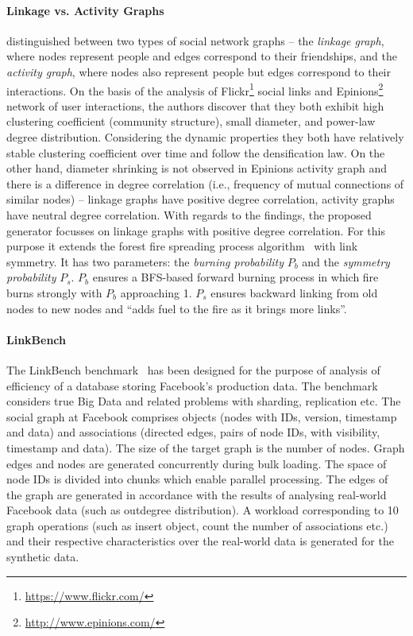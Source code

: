 \paragraph{Linkage vs. Activity Graphs}
\cite{Yao2011} distinguished between two types of social network graphs -- the
\emph{linkage graph}, where nodes represent people and edges correspond to their
friendships, and the \emph{activity graph}, where nodes also represent people
but edges correspond to their interactions. On the basis of the analysis of
Flickr\footnote{\url{https://www.flickr.com/}} social links and
Epinions\footnote{\url{http://www.epinions.com/}} network of user interactions,
the authors discover that they both exhibit high clustering coefficient
(community structure), small diameter, and power-law degree distribution.
Considering the dynamic properties they both have relatively stable clustering
coefficient over time and follow the densification law. On the other hand,
diameter shrinking is not observed in Epinions activity graph and there is a
difference in degree correlation (i.e., frequency of mutual connections of
similar nodes) -- linkage graphs have positive degree correlation, activity
graphs have neutral degree correlation. With regards to the findings, the
proposed generator focusses on linkage graphs with positive degree correlation.
For this purpose it extends the forest fire spreading process
algorithm~\cite{Leskovec:2005:GOT:1081870.1081893} with link symmetry. It has
two parameters: the \emph{burning probability} $P_b$ and the \emph{symmetry
probability} $P_s$. $P_b$ ensures a BFS-based forward burning process in which
fire burns strongly with $P_b$ approaching 1.  $P_s$ ensures backward linking
from old nodes to new nodes and ``adds fuel to the fire as it brings more
links''. %


\paragraph{LinkBench} The LinkBench
benchmark~\cite{Armstrong:2013:LDB:2463676.2465296} has been designed for the
purpose of analysis of efficiency of a database storing Facebook's production
data. The benchmark considers true Big Data and related problems with sharding,
replication etc. The social graph at Facebook comprises objects (nodes with IDs,
version, timestamp and data) and associations (directed edges, pairs of node
IDs, with visibility, timestamp and data). The size of the target graph is the
number of nodes. Graph edges and nodes are generated concurrently during bulk
loading. The space of node IDs is divided into chunks which enable parallel
processing. The edges of the graph are generated in accordance with the results
of analysing  real-world Facebook data (such as outdegree distribution). A
workload corresponding to 10 graph operations (such as insert object, count the
number of associations etc.) and their respective characteristics over the
real-world data is generated for the synthetic data.

